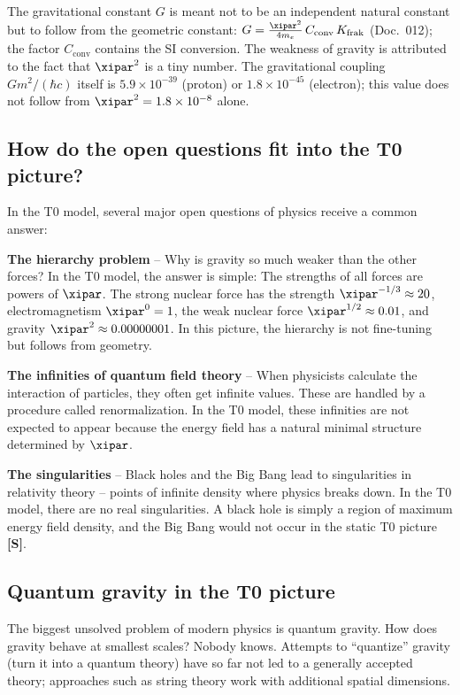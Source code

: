 	The gravitational constant $G$ is meant not to be an independent natural constant but to follow from the geometric constant: $G = \frac{\xipar^2}{4m_e}\,C_{\text{conv}}\,K_{\text{frak}}$ (Doc.~012); the factor $C_{\text{conv}}$ contains the SI conversion. The weakness of gravity is attributed to the fact that $\xipar^2$ is a tiny number. The gravitational coupling $Gm^2/(\hbar c)$ itself is $5.9\times10^{-39}$ (proton) or $1.8\times10^{-45}$ (electron); this value does not follow from $\xipar^2 = 1.8\times10^{-8}$ alone.
	
	\subsection{How do the open questions fit into the T0 picture?}
	
	In the T0 model, several major open questions of physics receive a common answer:
	
	\textbf{The hierarchy problem} -- Why is gravity so much weaker than the other forces? In the T0 model, the answer is simple: The strengths of all forces are powers of $\xipar$. The strong nuclear force has the strength $\xipar^{-1/3} \approx 20$, electromagnetism $\xipar^0 = 1$, the weak nuclear force $\xipar^{1/2} \approx 0.01$, and gravity $\xipar^2 \approx 0.00000001$. In this picture, the hierarchy is not fine-tuning but follows from geometry.
	
	\textbf{The infinities of quantum field theory} -- When physicists calculate the interaction of particles, they often get infinite values. These are handled by a procedure called renormalization. In the T0 model, these infinities are not expected to appear because the energy field has a natural minimal structure determined by $\xipar$.
	
	\textbf{The singularities} -- Black holes and the Big Bang lead to singularities in relativity theory -- points of infinite density where physics breaks down. In the T0 model, there are no real singularities. A black hole is simply a region of maximum energy field density, and the Big Bang would not occur in the static T0 picture \textbf{[S]}.
	
	\subsection{Quantum gravity in the T0 picture}
	
	The biggest unsolved problem of modern physics is quantum gravity. How does gravity behave at smallest scales? Nobody knows. Attempts to ``quantize'' gravity (turn it into a quantum theory) have so far not led to a generally accepted theory; approaches such as string theory work with additional spatial dimensions.
	
